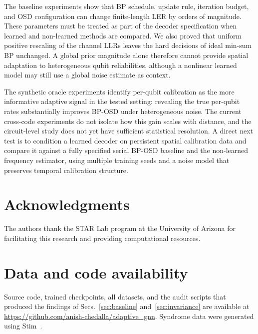 \documentclass[a4paper,twocolumn,11pt,nopdfoutputerror]{quantumarticle}
\begin{document}
The baseline experiments show that BP schedule, update rule, iteration
budget, and OSD configuration can change finite-length LER by orders of
magnitude. These parameters must be treated as part of the decoder
specification when learned and non-learned methods are compared. We also
proved that uniform positive rescaling of the channel LLRs leaves the
hard decisions of ideal min-sum BP unchanged. A global prior magnitude
alone therefore cannot provide spatial adaptation to heterogeneous qubit
reliabilities, although a nonlinear learned model may still use a global
noise estimate as context.

The synthetic oracle experiments identify per-qubit calibration as the
more informative adaptive signal in the tested setting: revealing the
true per-qubit rates substantially improves BP-OSD under heterogeneous
noise. The current cross-code experiments do not isolate how this gain
scales with distance, and the circuit-level study does not yet have
sufficient statistical resolution. A direct next test is to condition a
learned decoder on persistent spatial calibration data and compare it
against a fully specified serial BP-OSD baseline and the non-learned
frequency estimator, using multiple training seeds and a noise model that
preserves temporal calibration structure.
\section*{Acknowledgments}

The authors thank the STAR Lab program at the University of Arizona
for facilitating this research and providing computational resources.

\section*{Data and code availability}

Source code, trained checkpoints, all datasets, and the audit scripts
that produced the findings of Secs.~\ref{sec:baseline}
and~\ref{sec:invariance} are available at
\url{https://github.com/anish-chedalla/adaptive_gnn}.
Syndrome data were generated using Stim~\cite{Gidney2021Stim}.



\end{document}
